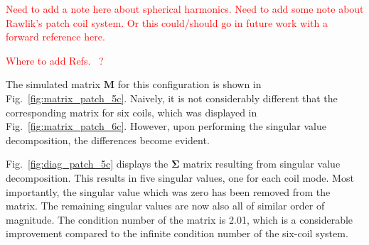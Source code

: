 \textcolor{red}{Need to add a note here about spherical harmonics. Need to add some note about Rawlik's patch coil system.  Or this could/should go in future work with a forward reference here.}

\textcolor{red}{Where to add Refs.~\cite{field_abel,field_jeff} ?}






The simulated matrix $\bm{M}$ for this configuration is shown in
Fig.~\ref{fig:matrix_patch_5c}.  Naively, it is not considerably
different that the corresponding matrix for six coils, which was
displayed in Fig.~\ref{fig:matrix_patch_6c}.  However, upon performing
the singular value decomposition, the differences become evident.




Fig.~\ref{fig:diag_patch_5c} displays the $\bm{\Sigma}$ matrix
resulting from singular value decomposition.  This results in five
singular values, one for each coil mode.  Most importantly, the
singular value which was zero has been removed from the matrix.  The
remaining singular values are now also all of similar order of
magnitude.  The condition number of the matrix is 2.01, which is a
considerable improvement compared to the infinite condition number of
the six-coil system.

